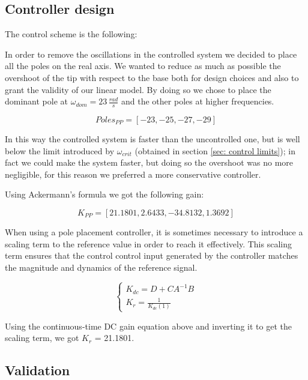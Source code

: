 \subsection{Controller design}

The control scheme is the following:


In order to remove the oscillations in the controlled system we decided to place all the poles on the real axis.
We wanted to reduce as much as possible the overshoot of the tip with respect to the base both for design choices and also to grant the validity of our linear model. By doing so we chose to place the dominant pole at $\omega_{dom} = 23 \, \frac{rad}{s}$ and the other poles at higher frequencies. 

\begin{equation*}
    Poles_{PP}= [-23, -25, -27, -29]
\end{equation*}

In this way the controlled system is faster than the uncontrolled one, but is well below the limit introduced by $\omega_{crit}$ (obtained in section \ref{sec: control limits}); in fact we could make the system faster, but doing so the overshoot was no more negligible, for this reason we preferred a more conservative controller.

Using Ackermann's formula we got the following gain:
  
\begin{equation*}
    K_{PP}= [21.1801, 2.6433, -34.8132, 1.3692]
\end{equation*}

When using a pole placement controller, it is sometimes necessary to introduce a scaling term to the reference value in order to reach it effectively. This scaling term ensures that the control control input generated by the controller matches the magnitude and dynamics of the reference signal.


\begin{equation*}
    \begin{cases}
        K_{dc} = D+CA^{-1}B \\
        K_r = \frac{1}{K_{dc}(1)} 
    \end{cases}
\end{equation*}

Using the continuous-time DC gain equation above and inverting it to get the scaling term, we got $K_r$ = 21.1801.

\subsection{Validation}

